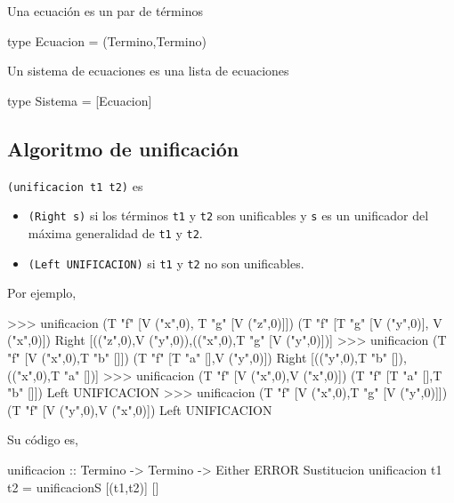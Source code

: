 Una ecuación es un par de términos 
\begin{codigo}
type Ecuacion = (Termino,Termino)
\end{codigo}

Un sistema de ecuaciones es una lista de ecuaciones 
\begin{codigo}
type Sistema = [Ecuacion]
\end{codigo}

\subsection{Algoritmo de unificación}

 \texttt{(unificacion t1 t2)} es
\begin{itemize}
\item \texttt{(Right s)} si los términos \texttt{t1} y \texttt{t2} son
  unificables y \texttt{s} es un unificador del máxima generalidad de
  \texttt{t1} y \texttt{t2}.
\item \texttt{(Left UNIFICACION)} si \texttt{t1} y \texttt{t2} no son
  unificables.
\end{itemize}
Por ejemplo,
\begin{sesion}
>>> unificacion (T "f" [V ("x",0), T "g" [V ("z",0)]])
                  (T "f" [T "g" [V ("y",0)], V ("x",0)])
Right [(("z",0),V ("y",0)),(("x",0),T "g" [V ("y",0)])]
>>> unificacion (T "f" [V ("x",0),T "b" []])
                  (T "f" [T "a" [],V ("y",0)])
Right [(("y",0),T "b" []),(("x",0),T "a" [])]
>>> unificacion (T "f" [V ("x",0),V ("x",0)])
                  (T "f" [T "a" [],T "b" []])
Left UNIFICACION
>>> unificacion (T "f" [V ("x",0),T "g" [V ("y",0)]])
                  (T "f" [V ("y",0),V ("x",0)])
Left UNIFICACION
\end{sesion}

Su código es,
\begin{codigo}
unificacion :: Termino -> Termino -> Either ERROR Sustitucion
unificacion t1 t2 = unificacionS [(t1,t2)] []
\end{codigo}
 


